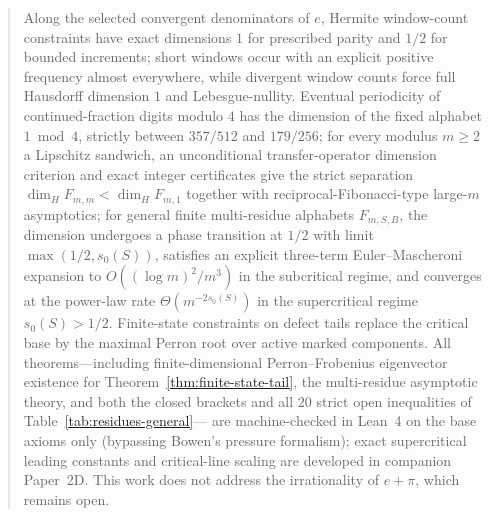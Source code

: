 
\maketitle

\begin{abstract}
Along the selected convergent denominators of $e$, Hermite window-count
constraints have exact dimensions $1$ for prescribed parity and $1/2$ for
bounded increments; short windows occur with an explicit positive frequency
almost everywhere, while divergent window counts force full Hausdorff
dimension $1$ and Lebesgue-nullity. Eventual periodicity of
continued-fraction digits modulo $4$ has the dimension of the fixed alphabet
$1\bmod4$, strictly between $357/512$ and $179/256$; for every modulus
$m\ge2$ a Lipschitz sandwich, an unconditional transfer-operator dimension
criterion and exact integer certificates give the strict separation
$\dim_H F_{m,m}<\dim_H F_{m,1}$ together with reciprocal-Fibonacci-type
large-$m$ asymptotics; for general finite multi-residue alphabets $F_{m,S,B}$,
the dimension undergoes a phase transition at $1/2$ with limit
$\max(1/2,s_0(S))$, satisfies an explicit three-term Euler--Mascheroni
expansion to $O((\log m)^2/m^3)$ in the subcritical regime, and converges at
the power-law rate $\Theta(m^{-2s_0(S)})$ in the supercritical regime
$s_0(S)>1/2$. Finite-state constraints on defect tails replace the
critical base by the maximal Perron root over active marked components. All theorems---including finite-dimensional Perron--Frobenius eigenvector existence for
Theorem~\ref{thm:finite-state-tail}, the multi-residue asymptotic theory, and both the
closed brackets and all $20$ strict open inequalities of Table~\ref{tab:residues-general}---
are machine-checked in Lean~4 on the base axioms only (bypassing Bowen's pressure
formalism); exact supercritical leading constants and critical-line scaling are
developed in companion Paper~2D.
This work does not address the irrationality of
$e+\pi$, which remains open.
\end{abstract}
